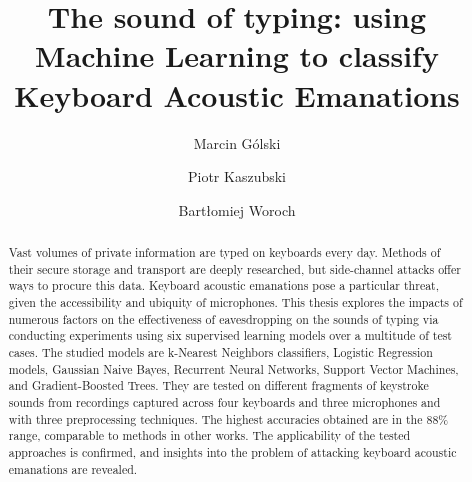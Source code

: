 \documentclass[bachelor,a4paper,oneside]{ppfcmthesis}
\author{%
   Marcin Gólski \album{148262}%
   \and Piotr Kaszubski \album{148283}%
   \and Bartłomiej Woroch \album{148277}%
}
\title{The sound of typing: using Machine Learning to classify Keyboard Acoustic Emanations}
\begin{document}
\frontmatter\pagestyle{empty}%
\maketitle\cleardoublepage%




\pagestyle{ppfcmthesis}%
\tableofcontents*
\cleardoublepage %


\begin{abstract}    

\noindent Vast volumes of private information are typed on keyboards every day. Methods of their secure storage and transport are deeply researched, but side-channel attacks offer ways to procure this data. Keyboard acoustic emanations pose a particular threat, given the accessibility and ubiquity of microphones. This thesis explores the impacts of numerous factors on the effectiveness of eavesdropping on the sounds of typing via conducting experiments using six supervised learning models over a multitude of test cases. The studied models are k-Nearest Neighbors classifiers, Logistic Regression models, Gaussian Naive Bayes, Recurrent Neural Networks, Support Vector Machines, and Gradient-Boosted Trees. They are tested on different fragments of keystroke sounds from recordings captured across four keyboards and three microphones and with three preprocessing techniques. The highest accuracies obtained are in the 88\% range, comparable to methods in other works. The applicability of the tested approaches is confirmed, and insights into the problem of attacking keyboard acoustic emanations are revealed.

\end{abstract}
\end{document}
